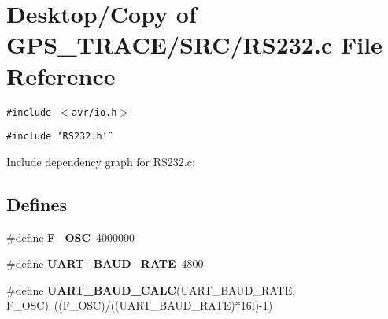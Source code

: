 \section{Desktop/Copy of GPS\_\-TRACE/SRC/RS232.c File Reference}
\label{_r_s232_8c}
{\tt \#include $<$avr/io.h$>$}\par
{\tt \#include \char`\"{}RS232.h\char`\"{}}\par


Include dependency graph for RS232.c:\subsection*{Defines}
\begin{CompactItemize}
\item 
\#define {\bf F\_\-OSC}~4000000
\item 
\#define {\bf UART\_\-BAUD\_\-RATE}~4800
\item 
\#define {\bf UART\_\-BAUD\_\-CALC}(UART\_\-BAUD\_\-RATE, F\_\-OSC)~((F\_\-OSC)/((UART\_\-BAUD\_\-RATE)$\ast$16l)-1)
\end{CompactItemize}
